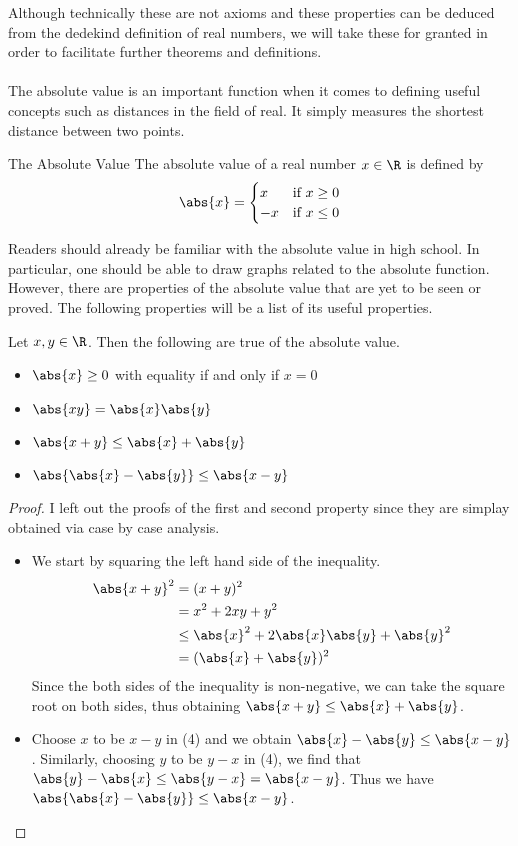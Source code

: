 Although technically these are not axioms and these properties can be deduced from the dedekind definition of real numbers, we will take these for granted in order to facilitate further theorems and definitions. \\~\\

The absolute value is an important function when it comes to defining useful concepts such as distances in the field of real. It simply measures the shortest distance between two points. 

\begin{defn}{The Absolute Value}{} The absolute value of a real number $x\in\R$ is defined by
$$\abs{x}=\begin{cases}
x & \text{if $x\geq0$} \\
-x & \text{if $x\leq0$}
\end{cases}$$
\end{defn}

Readers should already be familiar with the absolute value in high school. In particular, one should be able to draw graphs related to the absolute function. However, there are properties of the absolute value that are yet to be seen or proved. The following properties will be a list of its useful properties. 

\begin{prp}{}{} Let $x,y\in\R$. Then the following are true of the absolute value. 
\begin{itemize}
\item $\abs{x}\geq 0$ with equality if and only if $x=0$
\item $\abs{xy}=\abs{x}\abs{y}$
\item $\abs{x+y}\leq\abs{x}+\abs{y}$
\item $\abs{\abs{x}-\abs{y}}\leq\abs{x-y}$
\end{itemize}\tcbline
\begin{proof} I left out the proofs of the first and second property since they are simplay obtained via case by case analysis. 
\begin{itemize}
\item We start by squaring the left hand side of the inequality. 
\begin{align*}
\abs{x+y}^2&=(x+y)^2 \\
&=x^2+2xy+y^2 \\
&\leq \abs{x}^2+2\abs{x}\abs{y}+\abs{y}^2 \\
&=(\abs{x}+\abs{y})^2
\end{align*}
Since the both sides of the inequality is non-negative, we can take the square root on both sides, thus obtaining $\abs{x+y}\leq\abs{x}+\abs{y}$. 
\item Choose $x$ to be $x-y$ in (4) and we obtain $\abs{x}-\abs{y}\leq\abs{x-y}$. Similarly, choosing $y$ to be $y-x$ in (4), we find that $\abs{y}-\abs{x}\leq\abs{y-x}=\abs{x-y}$. Thus we have $\abs{\abs{x}-\abs{y}}\leq\abs{x-y}$. 
\end{itemize}
\end{proof}
\end{prp}

